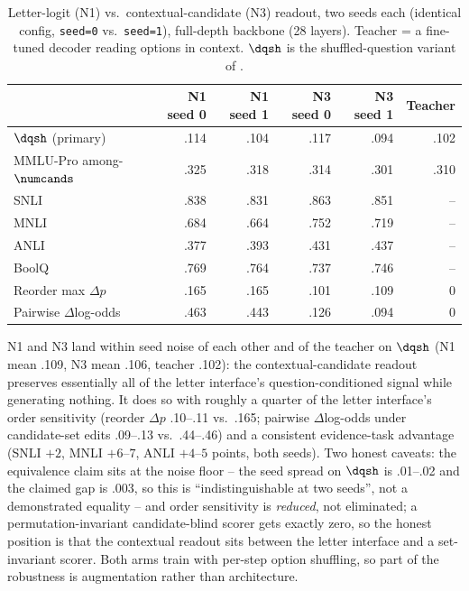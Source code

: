 \begin{table}[t]
  \centering
  \caption{Letter-logit (N1) vs.\ contextual-candidate (N3) readout, two seeds each (identical config,
  \texttt{seed=0} vs.\ \texttt{seed=1}), full-depth backbone (28 layers). Teacher = a fine-tuned decoder
  reading options in context. $\dqsh$ is the shuffled-question variant of .}
  \label{tab:n1n3}
  \small
  \setlength{\tabcolsep}{4pt}
  \begin{tabular}{lrrrrr}
    \toprule
    & N1 seed 0 & N1 seed 1 & N3 seed 0 & N3 seed 1 & Teacher \\
    \midrule
    $\dqsh$ (primary) & .114 & .104 & .117 & .094 & .102 \\
    MMLU-Pro among-$\numcands$ & .325 & .318 & .314 & .301 & .310 \\
    SNLI & .838 & .831 & .863 & .851 & -- \\
    MNLI & .684 & .664 & .752 & .719 & -- \\
    ANLI & .377 & .393 & .431 & .437 & -- \\
    BoolQ & .769 & .764 & .737 & .746 & -- \\
    Reorder max $\Delta p$ & .165 & .165 & .101 & .109 & 0 \\
    Pairwise $\Delta$log-odds & .463 & .443 & .126 & .094 & 0 \\
    \bottomrule
  \end{tabular}
\end{table}

N1 and N3 land within seed noise of each other and of the teacher on $\dqsh$ (N1 mean .109, N3 mean
.106, teacher .102): the contextual-candidate readout preserves essentially all of the letter
interface's question-conditioned signal while generating nothing. It does so with roughly a quarter of
the letter interface's order sensitivity (reorder $\Delta p$ .10--.11 vs.\ .165; pairwise
$\Delta$log-odds under candidate-set edits .09--.13 vs.\ .44--.46) and a consistent evidence-task
advantage (SNLI $+2$, MNLI $+6$--$7$, ANLI $+4$--$5$ points, both seeds). Two honest caveats: the
equivalence claim sits at the noise floor -- the seed spread on $\dqsh$ is .01--.02 and the claimed gap
is .003, so this is ``indistinguishable at two seeds'', not a demonstrated equality -- and order
sensitivity is \emph{reduced}, not eliminated; a permutation-invariant candidate-blind scorer gets
exactly zero, so the honest position is that the contextual readout sits between the letter interface
and a set-invariant scorer. Both arms train with per-step option shuffling, so part of the robustness is
augmentation rather than architecture.

